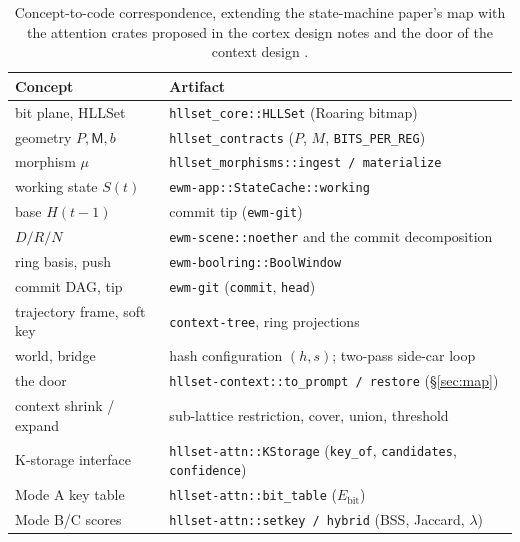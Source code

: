 \documentclass[11pt,a4paper]{article}
\theoremstyle{remark}
\newcommand{\Reg}{\ensuremath{\mathsf{M}}}             %
\newcommand{\Prec}{\ensuremath{P}}                     %
\newcommand{\Bits}{\ensuremath{b}}                     %
\begin{document}
\begin{table}[h]
\centering
\small
\begin{tabular}{@{}p{}p{}@{}}
\toprule
Concept & Artifact \\
\midrule
bit plane, HLLSet & \texttt{hllset\_core::HLLSet} (Roaring bitmap) \\
geometry $\Prec,\Reg,\Bits$ & \texttt{hllset\_contracts} ($P$, $M$, \texttt{BITS\_PER\_REG}) \\
morphism $\mu$ & \texttt{hllset\_morphisms::ingest / materialize} \\
working state $S(t)$ & \texttt{ewm-app::StateCache::working} \\
base $H(t{-}1)$ & commit tip (\texttt{ewm-git}) \\
$D/R/N$ & \texttt{ewm-scene::noether} and the commit decomposition \\
ring basis, push & \texttt{ewm-boolring::BoolWindow} \\
commit DAG, tip & \texttt{ewm-git} (\texttt{commit}, \texttt{head}) \\
trajectory frame, soft key & \texttt{context-tree}, ring projections \\
world, bridge & hash configuration $(h,s)$; two-pass side-car loop \\
the door & \texttt{hllset-context::to\_prompt / restore} (\S\ref{sec:map}) \\
context shrink / expand & sub-lattice restriction, cover, union, threshold \\
K-storage interface & \texttt{hllset-attn::KStorage} (\texttt{key\_of}, \texttt{candidates}, \texttt{confidence}) \\
Mode A key table & \texttt{hllset-attn::bit\_table} ($E_{\mathrm{bit}}$) \\
Mode B/C scores & \texttt{hllset-attn::setkey / hybrid} (BSS, Jaccard, $\lambda$) \\
\bottomrule
\end{tabular}
\caption{Concept-to-code correspondence, extending the state-machine paper's
map with the attention crates proposed in the cortex design notes
\cite{kspace2026,luttransformer2026} and the door of the context design
\cite{ctx2026}.}
\label{tab:impl}
\end{table}
\end{document}
